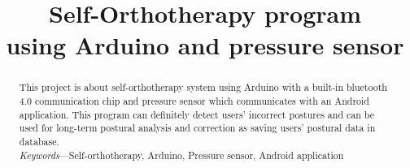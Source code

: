 \documentclass[conference]{IEEEtran}
\begin{document}
\normalsize
\title{Self-Orthotherapy program\\ 
using Arduino and pressure sensor 
}

\author{
\and
{}
\and
{}}
\maketitle

\begin{abstract}

This project is about self-orthotherapy system using Arduino with a built-in bluetooth 4.0 communication chip and pressure sensor which communicates with an Android application. This program can definitely detect users' incorrect postures and can be used for long-term postural analysis and correction as saving users' postural data in database.\\

\emph{Keywords}---Self-orthotherapy, Arduino, Pressure sensor, Android application \\\\\\\\\\

\end{abstract}
\renewcommand{\arrayrulewidth}{1pt}
\end{document}
